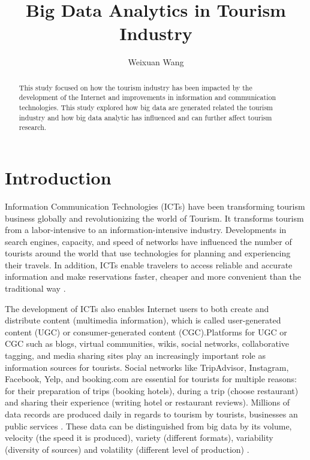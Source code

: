 \documentclass[sigconf]{acmart}
\begin{document}
\title{Big Data Analytics in Tourism Industry}


\author{Weixuan Wang}


\renewcommand{\shortauthors}{W. Wang}


\begin{abstract}
This study focused on how the tourism industry has been impacted by the
development of the Internet and improvements in information and communication
technologies. This study explored how big data are generated related the tourism industry and how big data analytic has influenced and can further affect tourism research.
\end{abstract}



\maketitle

\section{Introduction}

Information Communication Technologies (ICTs) have been transforming tourism business globally and revolutionizing the world of Tourism. It transforms tourism from a labor-intensive to an information-intensive industry\cite{Williams201787}. Developments in search engines, capacity, and speed of networks have influenced the number of tourists around the world that use technologies for planning and experiencing their travels. In addition, ICTs enable travelers to access reliable and accurate information and make reservations faster, cheaper and more convenient than the traditional way \cite{chung2009}.

The development of ICTs also enables Internet users to both create and distribute content (multimedia information), which is called user-generated content (UGC) or consumer-generated content (CGC)\cite{chung2009}.Platforms for UGC or CGC such as blogs, virtual communities, wikis, social networks, collaborative tagging, and media sharing sites play an increasingly important role as information sources for tourists. Social networks like TripAdvisor, Instagram, Facebook, Yelp, and booking.com are essential for tourists for multiple reasons: for their preparation of trips (booking hotels), during a trip (choose restaurant) and sharing their experience (writing hotel or restaurant reviews). Millions of data records are produced daily in regards to tourism by tourists, businesses an public services \cite{Shafiee16}. These data can be distinguished from big data by its volume, velocity (the speed it is produced), variety (different formats), variability (diversity of sources) and volatility (different level of production) \cite{MIAH2017}. 
\end{document}
